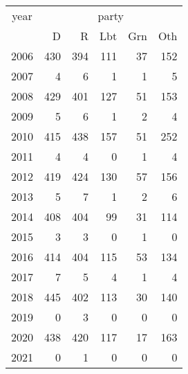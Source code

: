 \footnotesize\begin{tabular}[t]{lrrrrr}
\toprule
\multicolumn{1}{c}{year} & \multicolumn{5}{c}{party} \\
\cmidrule(l{3pt}r{3pt}){1-1} \cmidrule(l{3pt}r{3pt}){2-6}
  & D & R & Lbt & Grn & Oth\\
\midrule
2006 & 430 & 394 & 111 & 37 & 152\\
2007 & 4 & 6 & 1 & 1 & 5\\
2008 & 429 & 401 & 127 & 51 & 153\\
2009 & 5 & 6 & 1 & 2 & 4\\
2010 & 415 & 438 & 157 & 51 & 252\\
2011 & 4 & 4 & 0 & 1 & 4\\
2012 & 419 & 424 & 130 & 57 & 156\\
2013 & 5 & 7 & 1 & 2 & 6\\
2014 & 408 & 404 & 99 & 31 & 114\\
2015 & 3 & 3 & 0 & 1 & 0\\
2016 & 414 & 404 & 115 & 53 & 134\\
2017 & 7 & 5 & 4 & 1 & 4\\
2018 & 445 & 402 & 113 & 30 & 140\\
2019 & 0 & 3 & 0 & 0 & 0\\
2020 & 438 & 420 & 117 & 17 & 163\\
2021 & 0 & 1 & 0 & 0 & 0\\
\bottomrule
\end{tabular}
